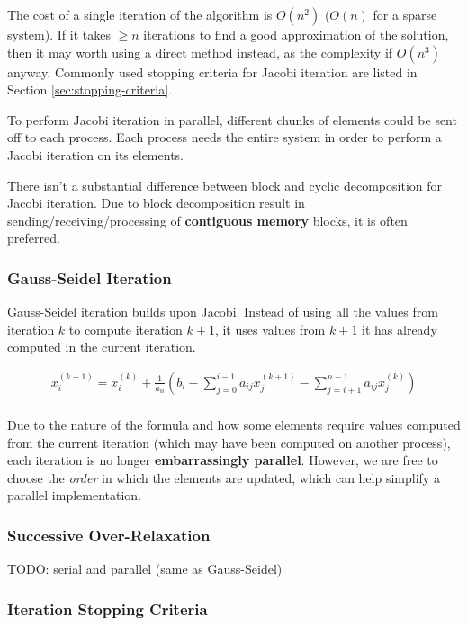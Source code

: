 \documentclass{article}
\begin{document}
The cost of a single iteration of the algorithm is $O(n^2)$ ($O(n)$ for a sparse system). If it takes $\geq n$ iterations to find a good approximation of the solution, then it may worth using a direct method instead, as the complexity if $O(n^3)$ anyway. Commonly used stopping criteria for Jacobi iteration are listed in Section \ref{sec:stopping-criteria}.

To perform Jacobi iteration in parallel, different chunks of elements could be sent off to each process. Each process needs the entire system in order to perform a Jacobi iteration on its elements.

There isn't a substantial difference between block and cyclic decomposition for Jacobi iteration. Due to block decomposition result in sending/receiving/processing of \textbf{contiguous memory} blocks, it is often preferred.

\subsubsection{Gauss-Seidel Iteration}

Gauss-Seidel iteration builds upon Jacobi. Instead of using all the values from iteration $k$ to compute iteration $k+1$, it uses values from $k+1$ it has already computed in the current iteration.

\begin{multline}
	x_i^{(k+1)} = x_i^{(k)} + \frac{1}{a_{ii}}(b_i - \sum_{j=0}^{i - 1} {a_{ij}x_{j}^{(k+1)}} - \sum_{j=i+1}^{n - 1} {a_{ij}x_{j}^{(k)}})
	\\
	\label{eq:gauss-seidel-elembyelem}
\end{multline}

Due to the nature of the formula and how some elements require values computed from the current iteration (which may have been computed on another process), each iteration is no longer \textbf{embarrassingly parallel}. However, we are free to choose the \textit{order} in which the elements are updated, which can help simplify a parallel implementation.

\subsubsection{Successive Over-Relaxation}

TODO: serial and parallel (same as Gauss-Seidel)

\subsubsection{Iteration Stopping Criteria}
\label{sec:stopping-crtieria}
\end{document}
